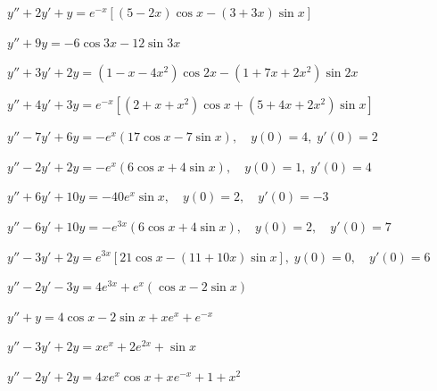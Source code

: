 \begin{exerciselist}

  \item\label{exer:5.5.18} \CGex $y''+2y'+y=e^{-x}\left[(5-2x)\cos x-(3+3x)\sin x\right]$

  \item\label{exer:5.5.19} \CGex $y''+9y=-6\cos3x-12\sin3x$

  \item\label{exer:5.5.20} \CGex $y''+3y'+2y=(1-x-4x^{2})\cos2x-(1+7x+2x^{2})\sin2x$

  \item\label{exer:5.5.21} \CGex
        $y''+4y'+3y=e^{-x}\left[(2+x+x^{2})\cos x+(5+4x+2x^{2})\sin x\right]$


  \item\label{exer:5.5.22} $y''-7y'+6y=-e^{x}(17\cos x-7\sin x),\quad y(0)=4,\;y'(0)=2$

  \item\label{exer:5.5.23} $y''-2y'+2y=-e^{x}(6\cos x+4\sin x),\quad y(0)=1,\;y'(0)=4$

  \item\label{exer:5.5.24} $y''+6y'+10y=-40e^{x}\sin x,\quad y(0)=2,\quad y'(0)=-3$

  \item\label{exer:5.5.25} $y''-6y'+10y=-e^{3x}(6\cos x+4\sin x),\quad y(0)=2,\quad y'(0)=7$

  \item\label{exer:5.5.26}
        $y''-3y'+2y=e^{3x}\left[21\cos x-(11+10x)\sin x\right], \;y(0)=0,\quad y'(0)=6$


  \item\label{exer:5.5.27} $y''-2y'-3y=4e^{3x}+e^{x}(\cos x-2\sin x)$

  \item\label{exer:5.5.28} $y''+y=4\cos x-2\sin x+xe^{x}+e^{-x}$

  \item\label{exer:5.5.29} $y''-3y'+2y=xe^{x}+2e^{2x}+\sin x$

  \item\label{exer:5.5.30} $y''-2y'+2y=4xe^{x}\cos x+xe^{-x}+1+x^{2}$


\end{exerciselist}
